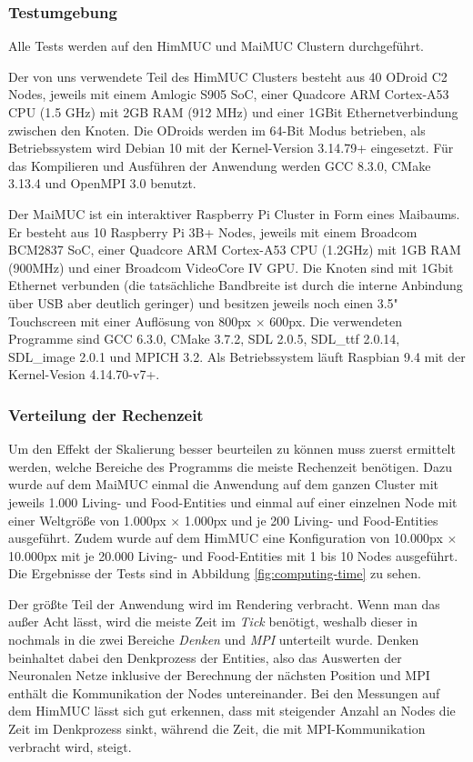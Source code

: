 \documentclass[course=erap]{aspdoc}
\begin{document}
\subsubsection{Testumgebung}
Alle Tests werden auf den HimMUC und MaiMUC Clustern durchgeführt.

Der von uns verwendete Teil des HimMUC Clusters besteht aus 40 ODroid C2 Nodes, jeweils mit einem Amlogic S905 SoC, einer Quadcore ARM Cortex-A53 CPU (1.5 GHz) mit 2GB RAM (912 MHz) und einer 1GBit Ethernetverbindung zwischen den Knoten. Die ODroids werden im 64-Bit Modus betrieben, als Betriebssystem wird Debian 10 mit der Kernel-Version 3.14.79+ eingesetzt. Für das Kompilieren und Ausführen der Anwendung werden GCC 8.3.0, CMake 3.13.4 und OpenMPI 3.0 benutzt.

Der MaiMUC ist ein interaktiver Raspberry Pi Cluster in Form eines Maibaums. Er besteht aus 10 Raspberry Pi 3B+ Nodes, jeweils mit einem Broadcom BCM2837 SoC, einer Quadcore ARM Cortex-A53 CPU (1.2GHz) mit 1GB RAM (900MHz) und einer Broadcom VideoCore IV GPU. Die Knoten sind mit 1Gbit Ethernet verbunden (die tatsächliche Bandbreite ist durch die interne Anbindung über USB aber deutlich geringer) und besitzen jeweils noch einen 3.5" Touchscreen mit einer Auflösung von 800px $\times$ 600px. Die verwendeten Programme sind GCC 6.3.0, CMake 3.7.2, SDL 2.0.5, SDL\_ttf 2.0.14, SDL\_image 2.0.1 und MPICH 3.2. Als Betriebssystem läuft Raspbian 9.4 mit der Kernel-Vesion 4.14.70-v7+.

\subsubsection{Verteilung der Rechenzeit}
\label{sssec:computing-times}
Um den Effekt der Skalierung besser beurteilen zu können muss zuerst ermittelt werden, welche Bereiche des Programms die meiste Rechenzeit benötigen. Dazu wurde auf dem MaiMUC einmal die Anwendung auf dem ganzen Cluster mit jeweils 1.000 Living- und Food-Entities und einmal auf einer einzelnen Node mit einer Weltgröße von 1.000px $\times$ 1.000px und je 200 Living- und Food-Entities ausgeführt. Zudem wurde auf dem HimMUC eine Konfiguration von 10.000px $\times$ 10.000px mit je 20.000 Living- und Food-Entities mit 1 bis 10 Nodes ausgeführt. Die Ergebnisse der Tests sind in Abbildung \ref{fig:computing-time} zu sehen.

Der größte Teil der Anwendung wird im Rendering verbracht. Wenn man das außer Acht lässt, wird die meiste Zeit im \emph{Tick} benötigt, weshalb dieser in nochmals in die zwei Bereiche \emph{Denken} und \emph{MPI} unterteilt wurde. Denken beinhaltet dabei den Denkprozess der Entities, also das Auswerten der Neuronalen Netze inklusive der Berechnung der nächsten Position und MPI enthält die Kommunikation der Nodes untereinander. Bei den Messungen auf dem HimMUC lässt sich gut erkennen, dass mit steigender Anzahl an Nodes die Zeit im Denkprozess sinkt, während die Zeit, die mit MPI-Kommunikation verbracht wird, steigt.
\end{document}
